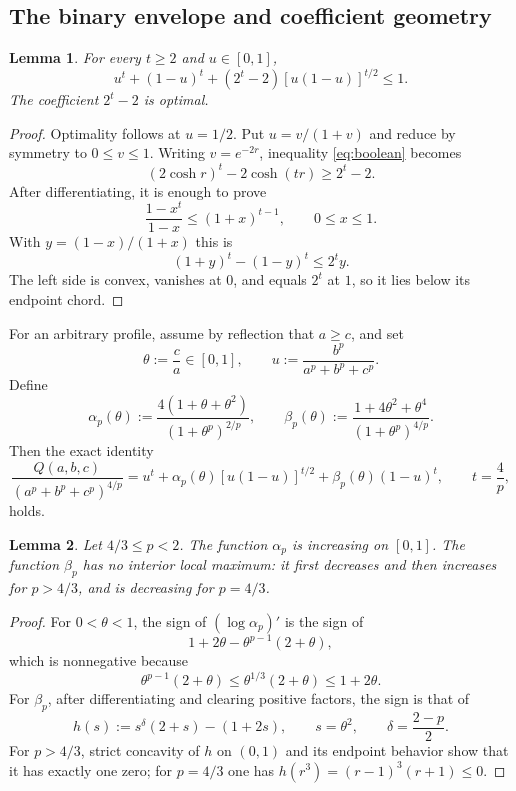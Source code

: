 \documentclass[11pt,reqno]{amsart}
\numberwithin{equation}{section}
\newtheorem{lemma}[lemma]{Lemma}
\theoremstyle{definition}
\theoremstyle{remark}
\begin{document}
\subsection{The binary envelope and coefficient geometry}

\begin{lemma}\label{lem:boolean}
For every $t\ge2$ and $u\in[0,1]$,
\begin{equation}\label{eq:boolean}
  u^t+(1-u)^t+(2^t-2)[u(1-u)]^{t/2}\le1.
\end{equation}
The coefficient $2^t-2$ is optimal.
\end{lemma}

\begin{proof}
Optimality follows at $u=1/2$.  Put $u=v/(1+v)$ and reduce by symmetry to
$0\le v\le1$.  Writing $v=e^{-2r}$, inequality \eqref{eq:boolean} becomes
\[
  (2\cosh r)^t-2\cosh(tr)\ge2^t-2.
\]
After differentiating, it is enough to prove
\[
  \frac{1-x^t}{1-x}\le(1+x)^{t-1},
  \qquad 0\le x\le1.
\]
With $y=(1-x)/(1+x)$ this is
\[
  (1+y)^t-(1-y)^t\le2^t y.
\]
The left side is convex, vanishes at $0$, and equals $2^t$ at $1$, so it
lies below its endpoint chord.
\end{proof}

For an arbitrary profile, assume by reflection that $a\ge c$, and set
\begin{equation}\label{eq:theta-u}
  \theta:=\frac ca\in[0,1],
  \qquad
  u:=\frac{b^p}{a^p+b^p+c^p}.
\end{equation}
Define
\begin{equation}\label{eq:alpha-beta}
  \alpha_p(\theta)
  :=\frac{4(1+\theta+\theta^2)}{(1+\theta^p)^{2/p}},
  \qquad
  \beta_p(\theta)
  :=\frac{1+4\theta^2+\theta^4}{(1+\theta^p)^{4/p}}.
\end{equation}
Then the exact identity
\begin{equation}\label{eq:profile-decomposition}
  \frac{Q(a,b,c)}{(a^p+b^p+c^p)^{4/p}}
  =u^t+\alpha_p(\theta)[u(1-u)]^{t/2}
  +\beta_p(\theta)(1-u)^t,
  \qquad t=\frac4p,
\end{equation}
holds.

\begin{lemma}\label{lem:coefficient-geometry}
Let $4/3\le p<2$.  The function $\alpha_p$ is increasing on $[0,1]$.
The function $\beta_p$ has no interior local maximum: it first decreases
and then increases for $p>4/3$, and is decreasing for $p=4/3$.
\end{lemma}

\begin{proof}
For $0<\theta<1$, the sign of $(\log\alpha_p)'$ is the sign of
\[
  1+2\theta-\theta^{p-1}(2+\theta),
\]
which is nonnegative because
\[
  \theta^{p-1}(2+\theta)
  \le\theta^{1/3}(2+\theta)\le1+2\theta.
\]
For $\beta_p$, after differentiating and clearing positive factors, the
sign is that of
\[
  h(s):=s^\delta(2+s)-(1+2s),
  \qquad s=\theta^2,
  \qquad \delta=\frac{2-p}{2}.
\]
For $p>4/3$, strict concavity of $h$ on $(0,1)$ and its endpoint behavior
show that it has exactly one zero; for $p=4/3$ one has
$h(r^3)=(r-1)^3(r+1)\le0$.
\end{proof}
\end{document}
